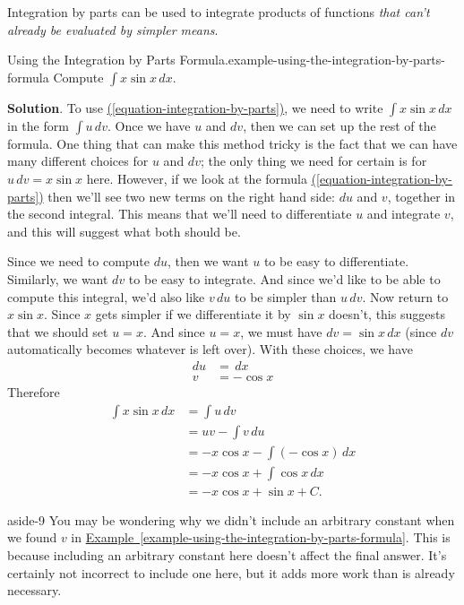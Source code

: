 \documentclass[10pt,]{book}
\numberwithin{equation}{section}
\begin{document}
Integration by parts can be used to integrate products of functions \emph{that can't already be evaluated by simpler means}.%
\begin{example}{Using the Integration by Parts Formula.}{example-using-the-integration-by-parts-formula}%
\hypertarget{p-500}{}%
Compute \(\int x\sin x\,dx\).%
\par\smallskip%
\noindent\textbf{Solution}.\hypertarget{solution-110}{}\quad%
\hypertarget{p-501}{}%
To use \hyperref[equation-integration-by-parts]{(\ref{equation-integration-by-parts})}, we need to write \(\int x\sin x\,dx\) in the form \(\int u\,dv\). Once we have \(u\) and \(dv\), then we can set up the rest of the formula. One thing that can make this method tricky is the fact that we can have many different choices for \(u\) and \(dv\); the only thing we need for certain is for \(u\,dv = x\sin x\) here. However, if we look at the formula \hyperref[equation-integration-by-parts]{(\ref{equation-integration-by-parts})} then we'll see two new terms on the right hand side: \(du\) and \(v\), together in the second integral. This means that we'll need to differentiate \(u\) and integrate \(v\), and this will suggest what both should be.%
\par
\hypertarget{p-502}{}%
Since we need to compute \(du\), then we want \(u\) to be easy to differentiate. Similarly, we want \(dv\) to be easy to integrate. And since we'd like to be able to compute this integral, we'd also like \(v\,du\) to be simpler than \(u\,dv\). Now return to \(x\sin x\). Since \(x\) gets simpler if we differentiate it by \(\sin x\) doesn't, this suggests that we should set \(u = x\). And since \(u = x\), we must have \(dv = \sin x\,dx\) (since \(dv\) automatically becomes whatever is left over). With these choices, we have%
%
\begin{align*}
du & = \,dx \\
v & = -\cos x 
\end{align*}
\hypertarget{p-503}{}%
Therefore%
%
\begin{align*}
\int x\sin x\,dx & = \int u\,dv \\
& = uv - \int v\,du \\
& = -x\cos x - \int (-\cos x)\,dx \\
& = -x\cos x + \int\cos x\,dx \\
& = -x\cos x + \sin x + C. 
\end{align*}
\end{example}
\begin{aside}{}{aside-9}%
\hypertarget{p-504}{}%
You may be wondering why we didn't include an arbitrary constant when we found \(v\) in \hyperref[example-using-the-integration-by-parts-formula]{Example~\ref{example-using-the-integration-by-parts-formula}}. This is because including an arbitrary constant here doesn't affect the final answer. It's certainly not incorrect to include one here, but it adds more work than is already necessary.%
\end{aside}
\end{document}
